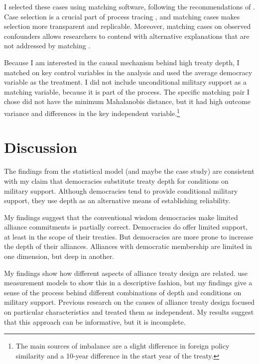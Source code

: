 \documentclass[12pt]{article}
\begin{document}
I selected these cases using matching software, following the recommendations of \citet{Nielsen2016}. 
Case selection is a crucial part of process tracing \citep{SeawrightGerring2008}, and matching cases makes selection more transparent and replicable. 
Moreover, matching cases on observed confounders allows researchers to contend with alternative explanations that are not addressed by matching \citep{Nielsen2016}. 


Because I am interested in the causal mechanism behind high treaty depth, I matched on key control variables in the analysis and used the average democracy variable as the treatment. 
I did not include unconditional military support as a matching variable, because it is part of the process. 
The specific matching pair I chose did not have the minimum Mahalanobis distance, but it had high outcome variance and differences in the key independent variable.\footnote{The main sources of imbalance are a slight difference in foreign policy similarity and a 10-year difference in the start year of the treaty.} 


\section{Discussion}


The findings from the statistical model (and maybe the case study) are consistent with my claim that democracies substitute treaty depth for conditions on military support. 
Although democracies tend to provide conditional military support, they use depth as an alternative means of 
establishing reliability. 

 
My findings suggest that the conventional wisdom democracies make limited alliance commitments is partially correct.
Democracies do offer limited support, at least in the scope of their treaties. 
But democracies are more prone to increase the depth of their alliances. 
Alliances with democratic membership are limited in one dimension, but deep in another. 


My findings show how different aspects of alliance treaty design are related. 
\citet{BensonClinton2016} use measurement models to show this in a descriptive fashion, but my findings give a sense of the process behind different combinations of depth and conditions on military support. 
Previous research on the causes of alliance treaty design \citep{Benson2012, Mattes2012, Chibaetal2015} focused on particular characteristics and treated them as independent. 
My results suggest that this approach can be informative, but it is incomplete. 
\end{document}
